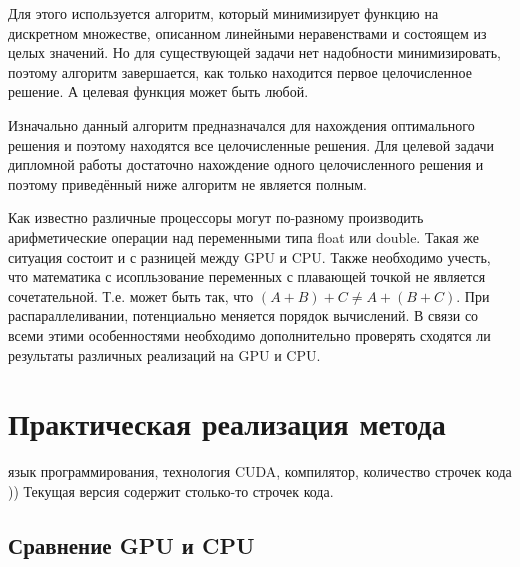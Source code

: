\documentclass[a4paper,14pt,russian]{extreport}
\begin{document}
Для этого используется алгоритм, который минимизирует функцию на дискретном множестве, описанном линейными неравенствами и состоящем из целых значений. Но для существующей задачи нет надобности минимизировать, поэтому алгоритм завершается, как только находится первое целочисленное решение. А целевая функция может быть любой. 
\par Изначально данный алгоритм предназначался для нахождения оптимального решения и поэтому находятся все целочисленные решения. Для целевой задачи дипломной работы достаточно нахождение одного целочисленного решения и поэтому приведённый ниже алгоритм не является полным. 
\par Как известно различные процессоры могут по-разному производить арифметические операции над переменными типа float или double. Такая же ситуация состоит и с разницей между GPU и CPU. Также необходимо учесть, что математика с исопльзование переменных с плавающей точкой не является сочетательной. Т.е. может быть так, что $(A+B)+C\neq A+(B+C)$. При распараллеливании, потенциально меняется порядок вычислений. В связи со всеми этими особенностями необходимо дополнительно проверять сходятся ли результаты различных реализаций на GPU и CPU. 


\chapter{Практическая реализация метода} 
 
язык программирования, технология CUDA, компилятор, количество строчек кода )) Текущая версия содержит столько-то строчек кода. 


\section{Сравнение GPU и CPU} 
\end{document}
